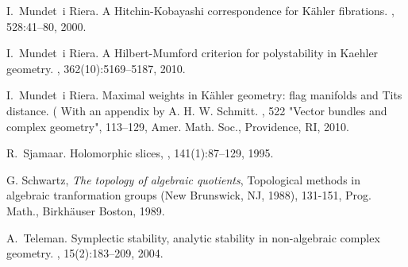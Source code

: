 \documentclass[leqno,11pt, a4]{amsart}
\theoremstyle{named}
\begin{document}
\begin{thebibliography}{10}
 I.~Mundet~i Riera.  \newblock A
  {H}itchin-{K}obayashi correspondence for {K}\"ahler fibrations.
  , 528:41--80, 2000.

 I.~Mundet~i Riera.  \newblock A
  {H}ilbert-{M}umford criterion for polystability in {K}aehler
  geometry.  ,
  362(10):5169--5187, 2010.

 I.~Mundet~i Riera.
\newblock Maximal weights in K\"ahler geometry: flag manifolds and Tits distance. (
With an appendix by A. H. W. Schmitt. , 522 "Vector bundles and complex geometry", 113--129, Amer. Math. Soc., Providence, RI, 2010.

 R.~Sjamaar.  \newblock Holomorphic slices,
  , 141(1):87--129, 1995.
  
 G. Schwartz, {\em The topology of algebraic quotients}, Topological methods in algebraic tranformation groups (New Brunswick, NJ, 1988), 131-151, Prog. Math., Birkh\"auser Boston, 1989.
  

 A.~Teleman.  \newblock
  Symplectic stability, analytic stability in non-algebraic complex
  geometry.  , 15(2):183--209, 2004.

\end{thebibliography}
\end{document}
